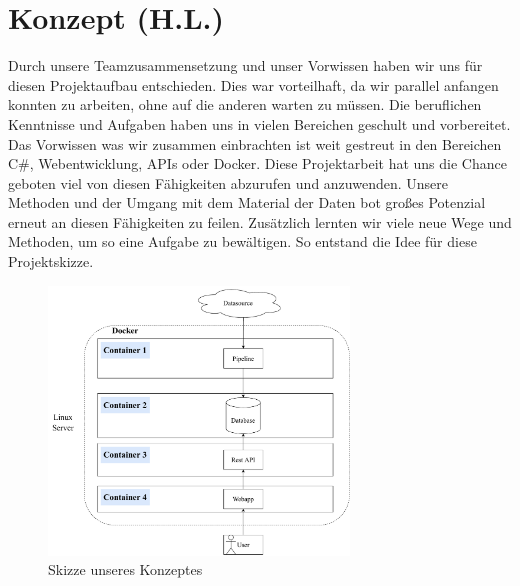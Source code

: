 \section{Konzept (H.L.)}
\label{sec-Konzept}

Durch unsere Teamzusammensetzung und unser Vorwissen haben wir uns für diesen Projektaufbau entschieden.
Dies war vorteilhaft, da wir parallel anfangen konnten zu arbeiten, ohne auf die anderen warten zu müssen.
Die beruflichen Kenntnisse und Aufgaben haben uns in vielen Bereichen geschult und vorbereitet. 
Das Vorwissen was wir zusammen einbrachten ist weit gestreut in den Bereichen C\#, Webentwicklung, APIs oder Docker.
Diese Projektarbeit hat uns die Chance geboten viel von diesen Fähigkeiten abzurufen und anzuwenden.
Unsere Methoden und der Umgang mit dem Material der Daten bot großes Potenzial erneut an diesen Fähigkeiten zu feilen.
Zusätzlich lernten wir viele neue Wege und Methoden, um so eine Aufgabe zu bewältigen.
So entstand die Idee für diese Projektskizze.

\begin{figure}[H]
    \centering
    \includegraphics[width=8cm]{figures/method.pdf}
    \caption{Skizze unseres Konzeptes}
    \label{fig:Skizze unserer Idee}
\end{figure}
